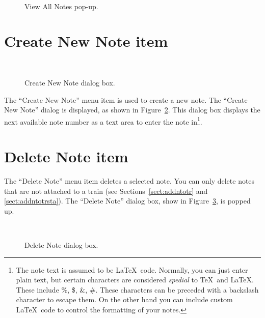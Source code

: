 \begin{figure}
\begin{centering}
\\
\caption{View All Notes pop-up.}
\label{fig:viewAllNotes}
\end{centering}
\end{figure}

\section{Create New Note item}
\label{sec:createNewNote}

\begin{figure}[h]
\begin{centering}
\\
\caption{Create New Note dialog box.}
\label{fig:createNewNote}
\end{centering}
\end{figure} The ``Create New Note'' menu item is used to create a new
note.  The ``Create New Note'' dialog is displayed, as shown in
Figure~\ref{fig:createNewNote}.  This dialog box displays the next
available note number as a text area to enter the note in\footnote{The
note text is assumed to be \LaTeX\ code.  Normally, you can just enter
plain text, but certain characters are considered {\em spedial} to
\TeX\ and \LaTeX.  These include \%, \$, \&, \#. These characters can
be preceded with a backslash character to escape them.  On the other
hand you can include custom \LaTeX\ code to control the formatting of
your notes.}. 



\section{Delete Note item} 

The ``Delete Note'' menu item deletes a selected note.  You can only
delete notes that are not attached to a train (see
Sections~\ref{sect:addntotr} and \ref{sect:addntotrsta}).  The ``Delete
Note'' dialog box, show in Figure~\ref{fig:deleteNote}, is popped up.

\begin{figure}
\begin{centering}
\\
\caption{Delete Note dialog box.}
\label{fig:deleteNote}
\end{centering}
\end{figure}

